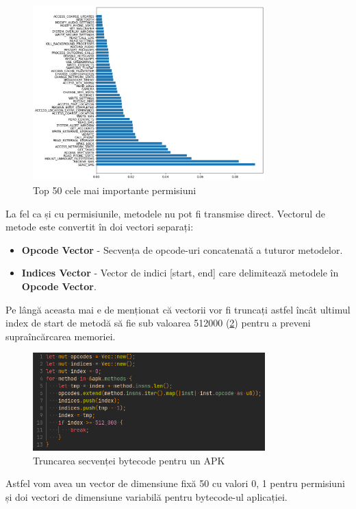 \documentclass[12pt,a4paper]{report}
\begin{document}
\begin{figure}[H]
      \centering
      \includegraphics[width=0.8\textwidth]{visuals/top50.png}
      \caption{Top 50 cele mai importante permisiuni}
      \label{fig:top50}
\end{figure}

La fel ca și cu permisiunile, metodele nu pot fi transmise direct. Vectorul de metode este convertit în doi vectori separați:
\begin{itemize}
      \item \textbf{Opcode Vector} - Secvența de opcode-uri concatenată a tuturor metodelor.
      \item \textbf{Indices Vector} - Vector de indici [start, end] care delimitează metodele în \textbf{Opcode Vector}.
\end{itemize}
Pe lângă aceasta mai e de menționat că vectorii vor fi truncați astfel încât ultimul index de start de metodă
să fie sub valoarea 512000 (\cref{fig:cap}) pentru a preveni supraîncărcarea memoriei.
\begin{figure}
      \centering
      \includegraphics[width=0.8\textwidth]{visuals/cap.png}
      \caption{Truncarea secvenței bytecode pentru un APK}
      \label{fig:cap}
\end{figure}

Astfel vom avea un vector de dimensiune fixă 50 cu valori 0, 1 pentru permisiuni
și doi vectori de dimensiune variabilă pentru bytecode-ul aplicației.
\end{document}

